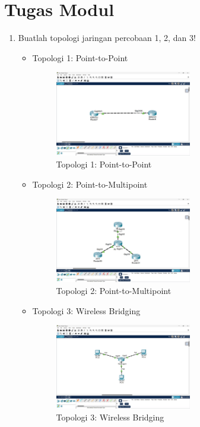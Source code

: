 \section*{Tugas Modul} %
\begin{enumerate}
  \item Buatlah topologi jaringan percobaan 1, 2, dan 3!
  
  \begin{itemize}
      \item Topologi 1: Point-to-Point
      \begin{figure}[H]
          \centering
          \includegraphics[width=0.6\textwidth]{img/point-point.jpeg}
          \caption{Topologi 1: Point-to-Point}
          \label{fig:topo1}
      \end{figure}
      \item Topologi 2: Point-to-Multipoint
      \begin{figure}[H]
          \centering
          \includegraphics[width=0.6\textwidth]{img/point-multipoint.jpeg}
          \caption{Topologi 2: Point-to-Multipoint}
          \label{fig:topo2}
      \end{figure}
      \item Topologi 3: Wireless Bridging
      \begin{figure}[H]
          \centering
          \includegraphics[width=0.6\textwidth]{img/wireless-bridging.jpeg}
          \caption{Topologi 3: Wireless Bridging}
          \label{fig:topo3}
      \end{figure}
  \end{itemize}


\end{enumerate}
